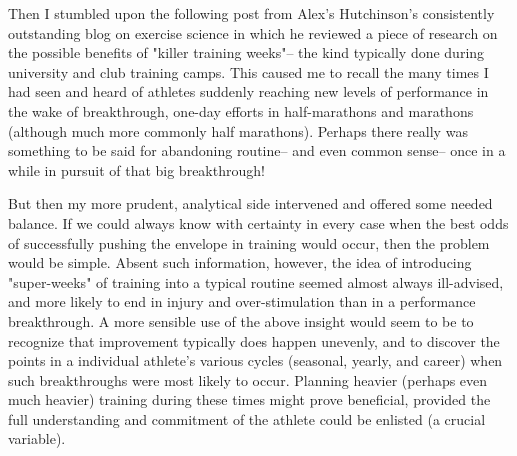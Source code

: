 Then I stumbled upon the following post from Alex's Hutchinson's consistently outstanding blog on exercise science in which he reviewed a piece of research on the possible benefits of "killer training weeks"-- the kind typically done during university and club training camps. This caused me to recall the many times I had seen and heard of athletes suddenly reaching new levels of performance in the wake of breakthrough, one-day efforts in half-marathons and marathons (although much more commonly half marathons). Perhaps there really was something to be said for abandoning routine-- and even common sense-- once in a while in pursuit of that big breakthrough!

But then my more prudent, analytical side intervened and offered some needed balance. If we could always know with certainty in every case when the best odds of successfully pushing the envelope in training would occur, then the problem would be simple. Absent such information, however, the idea of introducing "super-weeks" of training into a typical routine seemed almost always ill-advised, and more likely to end in injury and over-stimulation than in a performance breakthrough. A more sensible use of the above insight would seem to be to recognize that improvement typically does happen unevenly, and to discover the points in a individual athlete's various cycles (seasonal, yearly, and career) when such breakthroughs were most likely to occur. Planning heavier (perhaps even much heavier) training during these times might prove beneficial, provided the full understanding and commitment of the athlete could be enlisted (a crucial variable).

